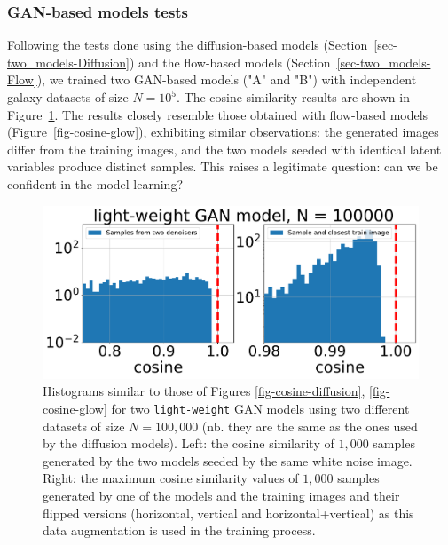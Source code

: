 \documentclass[fleqn,usenatbib]{mnras}
\begin{document}
\subsubsection{GAN-based models tests}
\label{sec-two_models-GAN}
%
Following the tests done using the diffusion-based models (Section~\ref{sec-two_models-Diffusion}) and the flow-based models (Section~\ref{sec-two_models-Flow}), we trained two GAN-based models ("A" and "B") with independent galaxy datasets of size $N=10^5$. The cosine similarity results are shown in Figure~\ref{fig-cosine-gan}. The results closely resemble those obtained with flow-based models (Figure~\ref{fig-cosine-glow}), exhibiting similar observations: the generated images differ from the training images, and the two models seeded with identical latent variables produce distinct samples. This raises a legitimate question: can we be confident in the model learning?
%
\begin{figure}
    \centering
	\includegraphics[width=\linewidth]{fig-gan-cosine-AB_ATrain.pdf}
	\caption{Histograms similar to those of Figures \ref{fig-cosine-diffusion}, \ref{fig-cosine-glow} for two \texttt{light-weight} GAN models using two different datasets of size $N=100,000$ (nb. they are the same as the ones used by the diffusion models). Left: the cosine similarity of $1,000$ samples generated by the two models seeded by the same white noise image. Right: the maximum cosine similarity values of $1,000$ samples generated by one of the models and the training images and their flipped versions (horizontal, vertical and horizontal+vertical) as this data augmentation is used in the training process.}
	\label{fig-cosine-gan} 
\end{figure}
\end{document}
